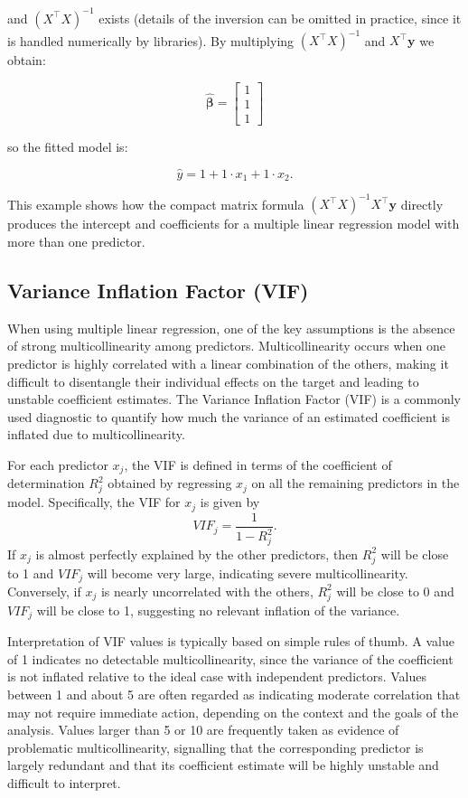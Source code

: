 and $(X^\top X)^{-1}$ exists (details of the inversion can be omitted in practice, since it is handled numerically by libraries). By multiplying $(X^\top X)^{-1}$ and $X^\top \mathbf{y}$ we obtain:

\[
\hat{\boldsymbol{\beta}} =
\begin{bmatrix}
1 \\
1 \\
1
\end{bmatrix}
\]

so the fitted model is:

\[
\hat{y} = 1 + 1 \cdot x_1 + 1 \cdot x_2.
\]

This example shows how the compact matrix formula $(X^\top X)^{-1} X^\top \mathbf{y}$ directly produces the intercept and coefficients for a multiple linear regression model with more than one predictor.



\subsection{Variance Inflation Factor (VIF)}

When using multiple linear regression, one of the key assumptions is the absence of strong multicollinearity among predictors. Multicollinearity occurs when one predictor is highly correlated with a linear combination of the others, making it difficult to disentangle their individual effects on the target and leading to unstable coefficient estimates. The Variance Inflation Factor (VIF) is a commonly used diagnostic to quantify how much the variance of an estimated coefficient is inflated due to multicollinearity.

For each predictor $x_j$, the VIF is defined in terms of the coefficient of determination $R_j^2$ obtained by regressing $x_j$ on all the remaining predictors in the model. Specifically, the VIF for $x_j$ is given by
\[
VIF_j = \frac{1}{1 - R_j^2}.
\]
If $x_j$ is almost perfectly explained by the other predictors, then $R_j^2$ will be close to 1 and $VIF_j$ will become very large, indicating severe multicollinearity. Conversely, if $x_j$ is nearly uncorrelated with the others, $R_j^2$ will be close to 0 and $VIF_j$ will be close to 1, suggesting no relevant inflation of the variance.

Interpretation of VIF values is typically based on simple rules of thumb. A value of 1 indicates no detectable multicollinearity, since the variance of the coefficient is not inflated relative to the ideal case with independent predictors. Values between 1 and about 5 are often regarded as indicating moderate correlation that may not require immediate action, depending on the context and the goals of the analysis. Values larger than 5 or 10 are frequently taken as evidence of problematic multicollinearity, signalling that the corresponding predictor is largely redundant and that its coefficient estimate will be highly unstable and difficult to interpret.

